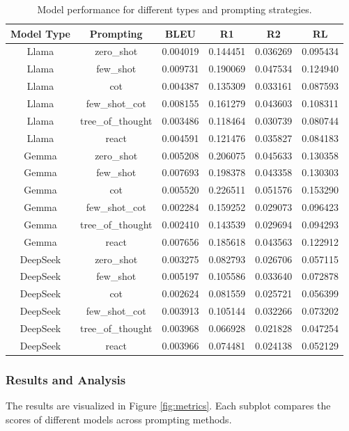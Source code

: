 \documentclass[letterpaper,11pt]{report}
\begin{document}
\begin{table}[h!]
\centering
\begin{tabular}{|c|c|c|c|c|c|}
\hline
\textbf{Model Type} & \textbf{Prompting} & \textbf{BLEU} & \textbf{R1} & \textbf{R2} & \textbf{RL} \\ \hline
Llama & zero\_shot & 0.004019 & 0.144451 & 0.036269 & 0.095434 \\ \hline
Llama & few\_shot & 0.009731 & 0.190069 & 0.047534 & 0.124940 \\ \hline
Llama & cot & 0.004387 & 0.135309 & 0.033161 & 0.087593 \\ \hline
Llama & few\_shot\_cot & 0.008155 & 0.161279 & 0.043603 & 0.108311 \\ \hline
Llama & tree\_of\_thought & 0.003486 & 0.118464 & 0.030739 & 0.080744 \\ \hline
Llama & react & 0.004591 & 0.121476 & 0.035827 & 0.084183 \\ \hline
Gemma & zero\_shot & 0.005208 & 0.206075 & 0.045633 & 0.130358 \\ \hline
Gemma & few\_shot & 0.007693 & 0.198378 & 0.043358 & 0.130303 \\ \hline
Gemma & cot & 0.005520 & 0.226511 & 0.051576 & 0.153290 \\ \hline
Gemma & few\_shot\_cot & 0.002284 & 0.159252 & 0.029073 & 0.096423 \\ \hline
Gemma & tree\_of\_thought & 0.002410 & 0.143539 & 0.029694 & 0.094293 \\ \hline
Gemma & react & 0.007656 & 0.185618 & 0.043563 & 0.122912 \\ \hline
DeepSeek & zero\_shot & 0.003275 & 0.082793 & 0.026706 & 0.057115 \\ \hline
DeepSeek & few\_shot & 0.005197 & 0.105586 & 0.033640 & 0.072878 \\ \hline
DeepSeek & cot & 0.002624 & 0.081559 & 0.025721 & 0.056399 \\ \hline
DeepSeek & few\_shot\_cot & 0.003913 & 0.105144 & 0.032266 & 0.073202 \\ \hline
DeepSeek & tree\_of\_thought & 0.003968 & 0.066928 & 0.021828 & 0.047254 \\ \hline
DeepSeek & react & 0.003966 & 0.074481 & 0.024138 & 0.052129 \\ \hline
\end{tabular}
\caption{Model performance for different types and prompting strategies.}
\label{tab:model_performance}
\end{table}


\subsubsection{Results and Analysis}
The results are visualized in Figure \ref{fig:metrics}. Each subplot compares the scores of different models across prompting methods.
\end{document}
